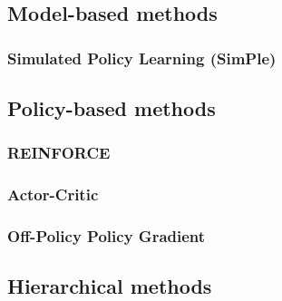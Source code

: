 \documentclass{article}
\begin{document}
\subsection{Model-based methods}

\subsubsection{Simulated Policy Learning (SimPle)}

\subsection{Policy-based methods}

\subsubsection{REINFORCE}

\subsubsection{Actor-Critic}

\subsubsection{Off-Policy Policy Gradient}

\subsection{Hierarchical methods}
\end{document}
